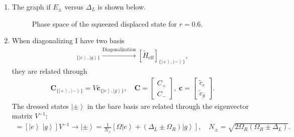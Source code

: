 \documentclass[letterpaper,11pt,twoside]{article}
\newcommand{\bC}{\bm{C}}
\newcommand{\ket}[1]{\left|#1\right\rangle}
\begin{document}
\begin{enumerate}[itemsep=0pt,topsep=0pt,parsep=0pt,label=\alph*)]
\begin{align*}
    V=S^{-1}=\frac{-N_+N_-}{2\Omega\Omega_R}\begin{bmatrix}
      \frac{\Delta_L-\Omega_R}{N_-}&-\frac{\Omega}{N_-}\\-\frac{\Delta_L+\Omega_R}{N_+}&\frac{\Omega}{N_+}
    \end{bmatrix}.
  \end{align*}
  \item The graph if $E_\pm$ versus $\Delta_L$ is shown below.
  \begin{figure}[htbp]
    \centering
    \caption{Phase space of the squeezed displaced state for $r=0.6$.}
  \end{figure}
  \item When diagonalizing I have two basis 
  \begin{align*}
    [\tilde{H}_{\mathrm{eff}}]_{\{\ket{e},\ket{g}\}}\xrightarrow{\text{Diagonalization}}[\tilde{H}_{\mathrm{eff}}]_{\{\ket{+},\ket{-}\}},
  \end{align*}
  they are related through 
  \begin{align*}
    \bC_{\{\ket{+},\ket{-}\}}=V\bm{c}_{\{\ket{e},\ket{g}\}},\quad \bC=\begin{bmatrix}
      C_+\\C_-
    \end{bmatrix},\;\bm{c}=\begin{bmatrix}
      \tilde{c}_e\\\tilde{c}_g
    \end{bmatrix}.
  \end{align*}
  The dressed states $\ket{\pm}$ in the bare basis are related through the eigenvector matrix $V^{-1}$:
  \begin{align*}
    [\ket{+}\;\ket{-}]=[\ket{e}\;\ket{g}]V^{-1}\longrightarrow\ket{\pm}=\frac{1}{N_\pm}[\Omega\ket{e}+(\Delta_L\pm\Omega_R)\ket{g}],\quad N_\pm=\sqrt{2\Omega_R(\Omega_R\pm\Delta_L)}.

\end{align*}
\end{enumerate}
\end{document}
